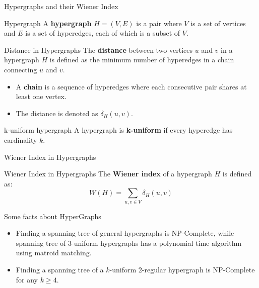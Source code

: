 \documentclass[11pt]{beamer}
\begin{document}
\begin{frame}{Hypergraphs and their Wiener Index}
	\pause
	\begin{block}{Hypergraph}
		A \textbf{hypergraph} $H = (V, E)$ is a pair where $V$ is a set of vertices and $E$ is a set of hyperedges, each of which is a subset of $V$.
	\end{block}

	\pause
	\begin{block}{Distance in Hypergraphs}
		The \textbf{distance} between two vertices $u$ and $v$ in a hypergraph $H$ is defined as the minimum number of hyperedges in a chain connecting $u$ and $v$.
		\begin{itemize}
			\item A \textbf{chain} is a sequence of hyperedges where each consecutive pair shares at least one vertex.
			\item The distance is denoted as $\delta_H(u, v)$.
		\end{itemize}
	\end{block}

	\pause
	\begin{block}{k-uniform hypergraph}
		A hypergraph is \textbf{k-uniform} if every hyperedge has cardinality $k$.
	\end{block}
\end{frame}

\begin{frame}{Wiener Index in Hypergraphs}
	\pause
	\begin{block}{Wiener Index in Hypergraphs}
		The \textbf{Wiener index} of a hypergraph $H$ is defined as:
		\[
			W(H) = \sum_{u, v \in V} \delta_H(u, v)
		\]
	\end{block}
\end{frame}

\begin{frame}{Some facts about HyperGraphs}
	\begin{itemize}
		\pause
		\item Finding a spanning tree of general hypergraphs is NP-Complete, while spanning tree of 3-uniform hypergraphs has a polynomial time algorithm using matroid matching. ~\cite{article:spanning_tree_3_uniform_hypergraph}
		      \pause
		\item Finding a spanning tree of a $k$-uniform 2-regular hypergraph is NP-Complete for any $k \geq 4$. ~\cite{article:spanning_tree_k_uniform_2_regular_hypergraph}
	\end{itemize}
\end{frame}
\end{document}
